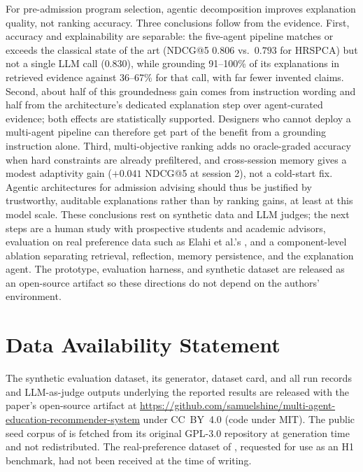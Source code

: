 \documentclass[conference]{IEEEtran}
\begin{document}
For pre-admission program selection, agentic decomposition improves explanation
quality, not ranking accuracy. Three conclusions follow from the evidence. First, accuracy
and explainability are separable: the five-agent pipeline matches or exceeds the classical
state of the art (NDCG@5 $0.806$ vs.\ $0.793$ for HRSPCA) but not a single LLM call
($0.830$), while grounding 91--100\% of its explanations in retrieved evidence against
36--67\% for that call, with far fewer invented claims. Second, about half of this
groundedness gain comes from instruction wording and half from the architecture's
dedicated explanation step over agent-curated evidence; both effects are statistically
supported. Designers who cannot deploy a multi-agent pipeline can therefore get part of
the benefit from a grounding instruction alone. Third, multi-objective ranking adds no
oracle-graded accuracy when hard constraints are already prefiltered, and cross-session
memory gives a modest adaptivity gain ($+0.041$ NDCG@5 at session 2), not a cold-start
fix. Agentic architectures for admission advising should thus be justified by
trustworthy, auditable explanations rather than by ranking gains, at least at this
model scale. These conclusions rest on synthetic data and LLM judges; the next steps are
a human study with prospective students and academic advisors, evaluation on real
preference data such as Elahi et al.'s \cite{universityrecsyselahi}, and a
component-level ablation separating retrieval, reflection, memory persistence, and the
explanation agent. The prototype, evaluation harness, and synthetic dataset are released
as an open-source artifact so these directions do not depend on the authors'
environment.

\section*{Data Availability Statement}
The synthetic evaluation dataset, its generator, dataset card, and all run records and
LLM-as-judge outputs underlying the reported results are released with the paper's
open-source artifact at
\url{https://github.com/samuelshine/multi-agent-education-recommender-system} under
CC~BY~4.0 (code under MIT). The public seed corpus of \cite{careerrecfeatureselection} is
fetched from its original GPL-3.0 repository at generation time and not redistributed. The
real-preference dataset of \cite{universityrecsyselahi}, requested for use as an H1
benchmark, had not been received at the time of writing.



\end{document}

